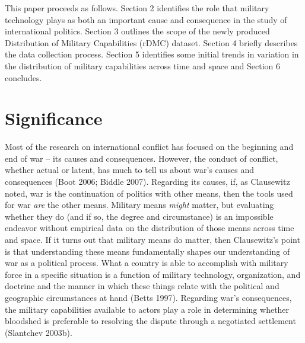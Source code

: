 \documentclass[
]{article}
\begin{document}
This paper proceeds as follows. Section 2 identifies the role that military technology plays as both an important cause and consequence in the study of international politics. Section 3 outlines the scope of the newly produced Distribution of Military Capabilities (rDMC) dataset. Section 4 briefly describes the data collection process. Section 5 identifies some initial trends in variation in the distribution of military capabilities across time and space and Section 6 concludes.

\hypertarget{significance}{%
\section{Significance}\label{significance}}

Most of the research on international conflict has focused on the beginning and end of war -- its causes and consequences. However, the conduct of conflict, whether actual or latent, has much to tell us about war's causes and consequences (Boot 2006; Biddle 2007). Regarding its causes, if, as Clausewitz noted, war is the continuation of politics with other means, then the tools used for war \textit{are} the other means. Military means \textit{might} matter, but evaluating whether they do (and if so, the degree and circumstance) is an impossible endeavor without empirical data on the distribution of those means across time and space. If it turns out that military means do matter, then Clausewitz's point is that understanding these means fundamentally shapes our understanding of war as a political process. What a country is able to accomplish with military force in a specific situation is a function of military technology, organization, and doctrine and the manner in which these things relate with the political and geographic circumstances at hand (Betts 1997). Regarding war's consequences, the military capabilities available to actors play a role in determining whether bloodshed is preferable to resolving the dispute through a negotiated settlement (Slantchev 2003b).
\end{document}
